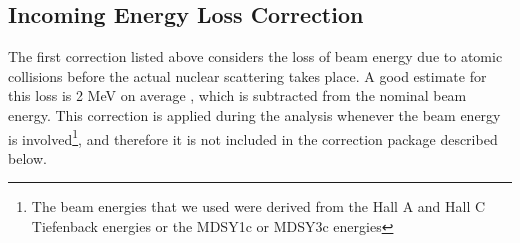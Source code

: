 \subsection{Incoming Energy Loss Correction}
The first correction listed above considers the loss of beam energy due to atomic collisions before the actual nuclear scattering takes place. %
A good estimate for this loss is 2 MeV on average \cite{pComKuhn, pComBosted}, which is subtracted from the nominal beam energy. This correction is applied during the analysis whenever the beam energy is involved\footnote{The beam energies that we used were derived from the Hall A and Hall C Tiefenback energies  or the MDSY1c or MDSY3c energies\cite{eg4Ebeam}}, %
and therefore it is not included in the correction package described below.





%
%

%



